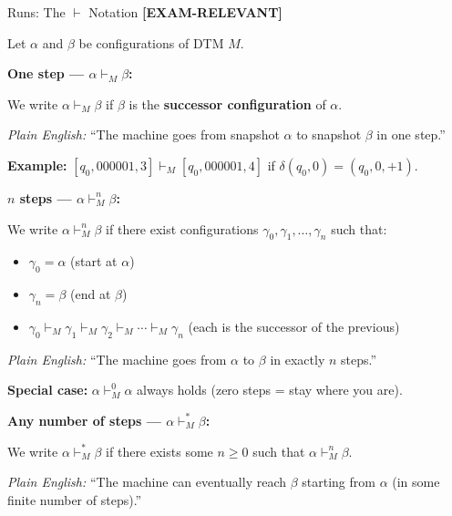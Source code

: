 \documentclass[11pt,a4paper]{article}
\newcommand{\kemark}{\textcolor{red!70!black}{\textbf{[EXAM-RELEVANT]}}}
\begin{document}
\begin{definitionbox}{{Runs: The $\vdash$ Notation \kemark}}

Let $\alpha$ and $\beta$ be configurations of DTM $M$.

\textbf{One step --- $\alpha \vdash_M \beta$:}

We write $\alpha \vdash_M \beta$ if $\beta$ is the \textbf{successor configuration} of $\alpha$.

\textit{Plain English:} ``The machine goes from snapshot $\alpha$ to snapshot $\beta$ in one step.''

\textbf{Example:} $[q_0, 000001, 3] \vdash_M [q_0, 000001, 4]$ if $\delta(q_0, 0) = (q_0, 0, +1)$.

\vspace{0.5em}
\textbf{$n$ steps --- $\alpha \vdash_M^n \beta$:}

We write $\alpha \vdash_M^n \beta$ if there exist configurations $\gamma_0, \gamma_1, \ldots, \gamma_n$ such that:
\begin{itemize}[nosep]
\item $\gamma_0 = \alpha$ \quad (start at $\alpha$)
\item $\gamma_n = \beta$ \quad (end at $\beta$)
\item $\gamma_0 \vdash_M \gamma_1 \vdash_M \gamma_2 \vdash_M \cdots \vdash_M \gamma_n$ \quad (each is the successor of the previous)
\end{itemize}

\textit{Plain English:} ``The machine goes from $\alpha$ to $\beta$ in exactly $n$ steps.''

\textbf{Special case:} $\alpha \vdash_M^0 \alpha$ always holds (zero steps = stay where you are).

\vspace{0.5em}
\textbf{Any number of steps --- $\alpha \vdash_M^* \beta$:}

We write $\alpha \vdash_M^* \beta$ if there exists some $n \geq 0$ such that $\alpha \vdash_M^n \beta$.

\textit{Plain English:} ``The machine can eventually reach $\beta$ starting from $\alpha$ (in some finite number of steps).''
\end{definitionbox}
\end{document}
